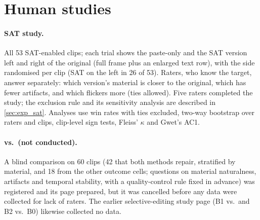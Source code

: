 \section{Human studies}
\label{sec:supp_human}
\paragraph{SAT study.} All 53 SAT-enabled clips; each trial shows the paste-only and the SAT version left and right of the original (full frame plus an enlarged text row), with the side randomised per clip (SAT on the left in 26 of 53). Raters, who know the target, answer separately: which version's material is closer to the original, which has fewer artifacts, and which flickers more (ties allowed). Five raters completed the study; the exclusion rule and its sensitivity analysis are described in \cref{sec:exp_sat}. Analyses use win rates with ties excluded, two-way bootstrap over raters and clips, clip-level sign tests, Fleiss' $\kappa$ and Gwet's AC1.

\paragraph{\method vs.\ \steer (not conducted).} A blind comparison on 60 clips (42 that both methods repair, stratified by material, and 18 from the other outcome cells; questions on material naturalness, artifacts and temporal stability, with a quality-control rule fixed in advance) was registered and its page prepared, but it was cancelled before any data were collected for lack of raters. The earlier selective-editing study page (B1 vs.\ \steer and B2 vs.\ B0) likewise collected no data.

